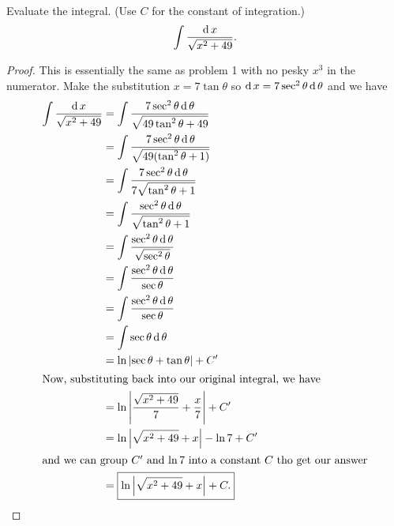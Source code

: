 \begin{problem}[WebAssign, HW 11, \#3]
Evaluate the integral. (Use $C$ for the constant of integration.)
\[
\int\frac{\operatorname{d} x}{\sqrt{x^2+49}}.
\]
\end{problem}
\begin{proof}
This is essentially the same as problem 1 with no pesky $x^3$ in the
numerator. Make the substitution $x=7\tan\theta$ so $\operatorname{d}
x=7\sec^2\theta\operatorname{d}\theta$ and we have
\begingroup
\allowdisplaybreaks
\begin{align*}
\int\frac{\operatorname{d} x}{\sqrt{x^2+49}}
&=\int\frac{7\sec^2\theta\operatorname{d}\theta}{\sqrt{49\tan^2\theta+49}}\\
&=\int\frac{7\sec^2\theta\operatorname{d}\theta}{\sqrt{49(\tan^2\theta+1)}}\\
&=\int\frac{7\sec^2\theta\operatorname{d}\theta}{7\sqrt{\tan^2\theta+1}}\\
&=\int\frac{\sec^2\theta\operatorname{d}\theta}{\sqrt{\tan^2\theta+1}}\\
&=\int\frac{\sec^2\theta\operatorname{d}\theta}{\sqrt{\sec^2\theta}}\\
&=\int\frac{\sec^2\theta\operatorname{d}\theta}{\sec\theta}\\
&=\int\frac{\sec^2\theta\operatorname{d}\theta}{\sec\theta}\\
&=\int\sec\theta\operatorname{d}\theta\\
&=\ln\left|\sec\theta+\tan\theta\right|+C'\\
\intertext{Now, substituting back into our original integral, we have}
&=\ln\left|\frac{\sqrt{x^2+49}}{7}+\frac{x}{7}\right|+C'\\
&=\ln\left|\sqrt{x^2+49}+x\right|-\ln 7+C'\\
\intertext{and we can group $C'$ and $\ln 7$ into a constant $C$ tho get
  our answer}
&=\boxed{\ln\left|\sqrt{x^2+49}+x\right|+C.}\qedhere
\end{align*}
\endgroup
\end{proof}

